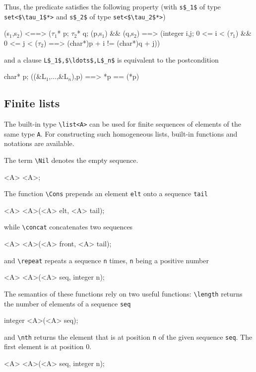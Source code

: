 Thus, the \separated predicate satisfies the following property (with
\lstinline|s$_1$| of type \lstinline|set<$\tau_1$*>| and \lstinline|s$_2$| of type
\lstinline|set<$\tau_2$*>|)
\begin{listing}{1}
\separated(s$_1$,s$_2$) <==>
  (\forall $\tau_1$* p; \forall $\tau_2$* q;
     \subset(p,s$_1$) && \subset(q,s$_2$) ==>
       (\forall integer i,j;
         0 <= i < \sizeof($\tau_1$) && 0 <= j < \sizeof($\tau_2$) ==>
           (char*)p + i != (char*)q + j))
\end{listing}

and a clause \assigns \lstinline|L$_1$,$\ldots$,L$_n$| is equivalent
to the postcondition
\begin{listing-nonumber}
\forall char* p; \separated(\union(&L$_1$,$\ldots$,&L$_n$),p) ==> *p == \old(*p)
\end{listing-nonumber}



\subsection{Finite lists}\label{sec:lists}
The built-in type \lstinline|\list<A>| can be used for finite
sequences of elements of the same type \lstinline|A|.
For constructing such homogeneous lists, built-in functions and notations are
available.

The term \lstinline|\Nil| denotes the empty sequence.
\begin{listing-nonumber}
\list<A> \Nil<A>;
\end{listing-nonumber}

The function \lstinline|\Cons| prepends an element \lstinline|elt|
onto a sequence \lstinline|tail|
\begin{listing-nonumber}
\list<A> \Cons<A>(<A> elt, \list<A> tail);
\end{listing-nonumber}
while \lstinline|\concat| concatenates two sequences
\begin{listing-nonumber}
\list<A> \concat<A>(\list<A> front, \list<A> tail);
\end{listing-nonumber}
and \lstinline|\repeat| repeats a sequence \lstinline|n| times, \lstinline|n| being a positive number
\begin{listing-nonumber}
\list<A> \repeat<A>(\list<A> seq, integer n);
\end{listing-nonumber}

The semantics of these functions rely on two useful functions:
\lstinline|\length| returns the number of elements of
a sequence \lstinline|seq|
\begin{listing-nonumber}
integer \length<A>(\list<A> seq);
\end{listing-nonumber}
and \lstinline|\nth| returns the element that is at position
\lstinline|n| of the given sequence \lstinline|seq|.
The first element is at position $0$.
\begin{listing-nonumber}
<A> \nth<A>(\list<A> seq, integer n);
\end{listing-nonumber}

